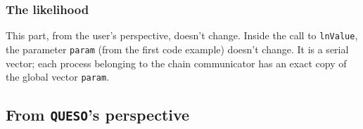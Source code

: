 \documentclass{article}
\newcommand{\Queso}{\texttt{QUESO}}
\begin{document}
\subsubsection{The likelihood}

This part, from the user's perspective, doesn't change.  Inside the call to
\lstinline|lnValue|, the parameter \lstinline|param| (from the first code
example) doesn't change.  It is a serial vector; each process belonging to the
chain communicator has an exact copy of the global vector \lstinline|param|.

\subsection{From \Queso's perspective}
\end{document}
